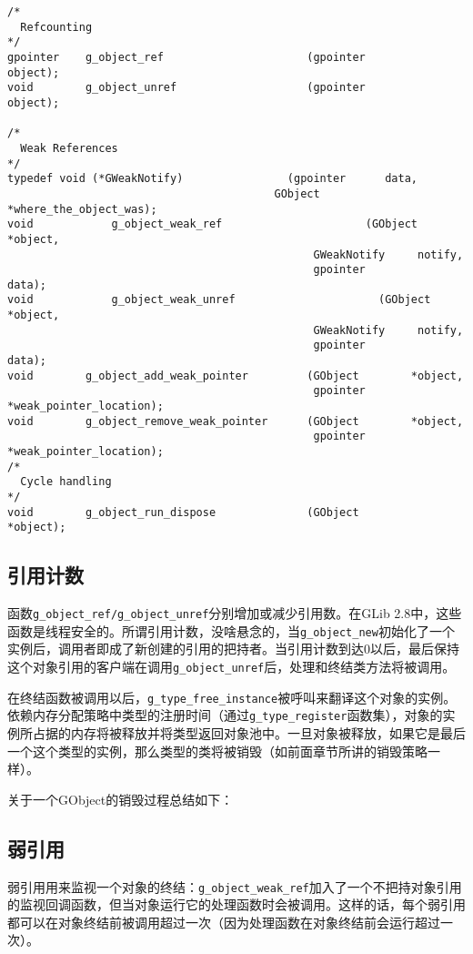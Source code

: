 \begin{verbatim}
/*
  Refcounting
*/
gpointer    g_object_ref                      (gpointer        object);
void        g_object_unref                    (gpointer        object);

/*
  Weak References
*/
typedef void (*GWeakNotify)                (gpointer      data,
                                         GObject      *where_the_object_was);
void            g_object_weak_ref                      (GObject              *object,
                                               GWeakNotify     notify,
                                               gpointer               data);
void            g_object_weak_unref                      (GObject              *object,
                                               GWeakNotify     notify,
                                               gpointer               data);
void        g_object_add_weak_pointer         (GObject        *object,
                                               gpointer       *weak_pointer_location);
void        g_object_remove_weak_pointer      (GObject        *object,
                                               gpointer       *weak_pointer_location);
/*
  Cycle handling
*/
void        g_object_run_dispose              (GObject              *object);
\end{verbatim}
\subsection{引用计数}
函数\verb|g_object_ref/g_object_unref|分别增加或减少引用数。在GLib 2.8中，这些函数是线程安全的。所谓引用计数，没啥悬念的，当\verb|g_object_new|初始化了一个实例后，调用者即成了新创建的引用的把持者。当引用计数到达0以后，最后保持这个对象引用的客户端在调用\verb|g_object_unref|后，处理和终结类方法将被调用。

在终结函数被调用以后，\verb|g_type_free_instance|被呼叫来翻译这个对象的实例。依赖内存分配策略中类型的注册时间（通过\verb|g_type_register|函数集），对象的实例所占据的内存将被释放并将类型返回对象池中。一旦对象被释放，如果它是最后一个这个类型的实例，那么类型的类将被销毁（如前面章节所讲的销毁策略一样）。

关于一个GObject的销毁过程总结如下：
\subsection{弱引用}
弱引用用来监视一个对象的终结：\verb|g_object_weak_ref|加入了一个不把持对象引用的监视回调函数，但当对象运行它的处理函数时会被调用。这样的话，每个弱引用都可以在对象终结前被调用超过一次（因为处理函数在对象终结前会运行超过一次）。

